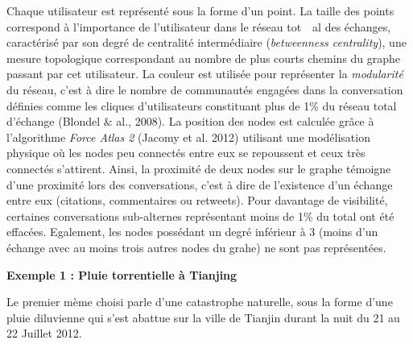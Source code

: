 Chaque utilisateur est repr\'esent\'e sous la forme d{\textquoteright}un
point. La taille des points correspond \`a l{\textquoteright}importance
de l{\textquoteright}utilisateur dans le r\'eseau tot\ \ al des
\'echanges, caract\'eris\'e par son degr\'e de centralit\'e
interm\'ediaire (\textit{betweenness centrality}), une mesure
topologique correspondant au nombre de plus courts chemins du graphe
passant par cet utilisateur. La couleur est utilis\'ee pour
repr\'esenter la \textit{modularit\'e }du r\'eseau,
c{\textquoteright}est \`a dire le nombre de communaut\'es engag\'ees
dans la conversation d\'efinies comme les cliques
d{\textquoteright}utilisateurs constituant plus de 1\% du r\'eseau
total d{\textquoteright}\'echange (Blondel \& al., 2008). La position
des nodes est calcul\'ee gr\^ace \`a l{\textquoteright}algorithme
\textit{Force Atlas 2} (Jacomy et al. 2012) utilisant une
mod\'elisation physique o\`u les nodes peu connect\'es entre eux se
repoussent et ceux tr\`es connect\'es s{\textquoteright}attirent.
Ainsi, la proximit\'e de deux nodes sur le graphe t\'emoigne
d{\textquoteright}une proximit\'e lors des conversations,
c{\textquoteright}est \`a dire de l{\textquoteright}existence
d{\textquoteright}un \'echange entre eux (citations, commentaires ou
retweets). Pour davantage de visibilit\'e, certaines conversations
sub-alternes repr\'esentant moins de 1\% du total ont \'et\'e
effac\'ees. Egalement, les nodes poss\'edant un degr\'e inf\'erieur \`a
3 (moins d{\textquoteright}un \'echange avec au moins trois autres
nodes du grahe) ne sont pas repr\'esent\'ees.



\textbf{Exemple 1 : Pluie torrentielle \`a Tianjing}

Le premier m\`eme choisi parle d{\textquoteright}une catastrophe
naturelle, sous la forme d{\textquoteright}une pluie diluvienne qui
s{\textquoteright}est abattue sur la ville de Tianjin durant la nuit du
21 au 22 Juillet 2012. 

